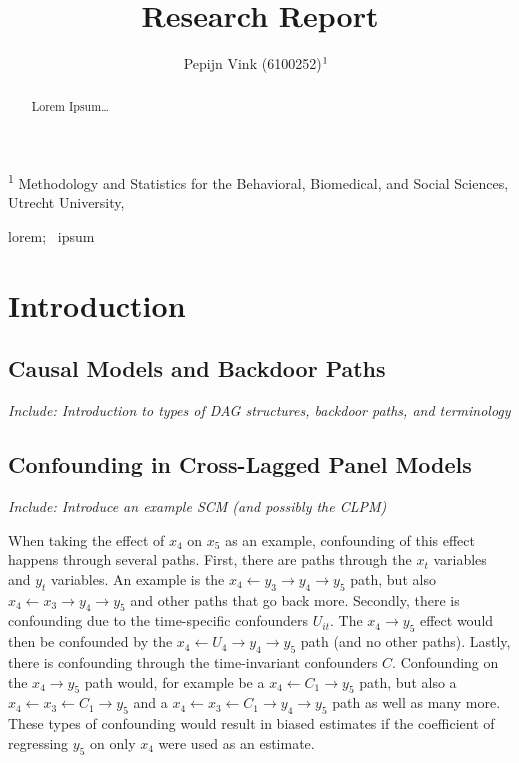 \documentclass[
]{interact}
\title{Research Report}
\author{Pepijn Vink
(6100252)$\textsuperscript{1}$~\orcidlink{0000-0001-6960-9904}}
\begin{document}
\captionsetup{labelsep=space}
\maketitle
\textsuperscript{1} Methodology and Statistics for the Behavioral,
Biomedical, and Social Sciences, Utrecht University,  
\begin{abstract}
Lorem Ipsum\ldots{}
\end{abstract}
\begin{keywords}
\def\sep{;\ }
lorem\sep 
ipsum
\end{keywords}
\ifdefined\Shaded\renewenvironment{Shaded}{\begin{tcolorbox}[interior hidden, borderline west={3pt}{0pt}{shadecolor}, breakable, sharp corners, boxrule=0pt, enhanced, frame hidden]}{\end{tcolorbox}}\fi

\newcommand{\indep}{\perp \!\!\! \perp}

\hypertarget{introduction}{%
\section{Introduction}\label{introduction}}

\hypertarget{causal-models-and-backdoor-paths}{%
\subsection{Causal Models and Backdoor
Paths}\label{causal-models-and-backdoor-paths}}

\emph{Include: Introduction to types of DAG structures, backdoor paths,
and terminology}

\hypertarget{confounding-in-cross-lagged-panel-models}{%
\subsection{Confounding in Cross-Lagged Panel
Models}\label{confounding-in-cross-lagged-panel-models}}

\emph{Include: Introduce an example SCM (and possibly the CLPM)}

When taking the effect of \(x_4\) on \(x_5\) as an example, confounding
of this effect happens through several paths. First, there are paths
through the \(x_t\) variables and \(y_t\) variables. An example is the
\(x_4 \leftarrow y_3 \rightarrow y_4 \rightarrow y_5\) path, but also
\(x_4 \leftarrow x_3 \rightarrow y_4 \rightarrow y_5\) and other paths
that go back more. Secondly, there is confounding due to the
time-specific confounders \(U_{it}\). The \(x_4 \rightarrow y_5\) effect
would then be confounded by the
\(x_4 \leftarrow U_4 \rightarrow y_4 \rightarrow y_5\) path (and no
other paths). Lastly, there is confounding through the time-invariant
confounders \(C\). Confounding on the \(x_4 \rightarrow y_5\) path
would, for example be a \(x_4 \leftarrow C_1 \rightarrow y_5\) path, but
also a \(x_4 \leftarrow x_3 \leftarrow C_1 \rightarrow y_5\) and a
\(x_4 \leftarrow x_3 \leftarrow C_1 \rightarrow y_4 \rightarrow y_5\)
path as well as many more. These types of confounding would result in
biased estimates if the coefficient of regressing \(y_5\) on only
\(x_4\) were used as an estimate.
\end{document}
